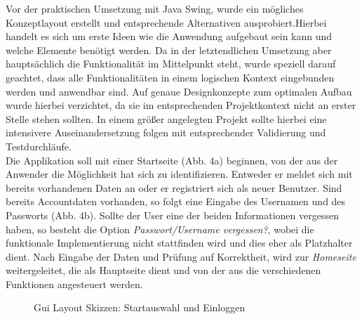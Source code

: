 Vor der praktischen Umsetzung mit Java Swing, wurde ein mögliches Konzeptlayout erstellt und entsprechende Alternativen ausprobiert.Hierbei handelt es sich um erste Ideen wie die Anwendung aufgebaut sein kann und welche Elemente benötigt werden.
Da in der letztendlichen Umsetzung aber hauptsächlich die Funktionalität im Mittelpunkt steht, wurde speziell darauf geachtet, dass alle Funktionalitäten in einem logischen Kontext eingebunden werden und anwendbar sind. Auf genaue Designkonzepte zum optimalen Aufbau wurde hierbei verzichtet, da sie im entsprechenden Projektkontext nicht an erster Stelle stehen sollten. In einem größer angelegten Projekt sollte hierbei eine intensivere Auseinandersetzung folgen mit entsprechender Validierung und Testdurchläufe. \\

Die Applikation soll mit einer Startseite (Abb. 4a) beginnen, von der aus der Anwender die Möglichkeit hat sich zu identifizieren. Entweder er meldet sich mit bereits vorhandenen Daten an oder er registriert sich als neuer Benutzer.
Sind bereits Accountdaten vorhanden, so folgt eine Eingabe des Usernamen und des Passworts (Abb. 4b). Sollte der User eine der beiden Informationen vergessen haben, so besteht die Option \textit{Passwort/Username vergessen?}, wobei die funktionale Implementierung nicht stattfinden wird und dies eher als Platzhalter dient. Nach Eingabe der Daten und Prüfung auf Korrektheit, wird zur \textit{Homeseite} weitergeleitet, die als Hauptseite dient und von der aus die verschiedenen Funktionen angesteuert werden.

\begin{figure}[h!]
\centering
\hfill %
\hfill %
\hfill %
\caption{Gui Layout Skizzen: Startauswahl und Einloggen }
\label{Gui}
\end{figure}




